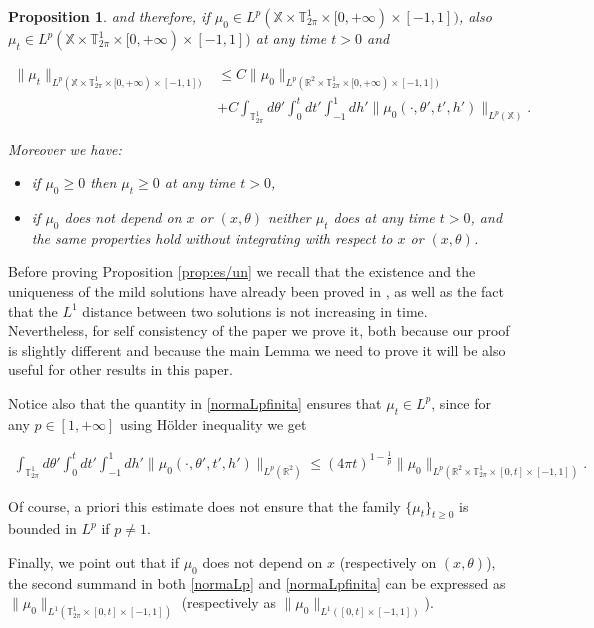 \documentclass[a4paper,10pt,reqno]{amsart}
\newtheorem{proposition}{Proposition}[section]
\numberwithin{equation}{subsection}
\numberwithin{figure}{subsection}
\begin{document}
\begin{proposition}
and therefore, if $\mu_0\in L^p(\mathbb{X}\times\mathbb{T}^1_{2\pi}\times[0,+\infty)\times[-1,1])$, also $\mu_t\in L^p(\mathbb{X}\times\mathbb{T}^1_{2\pi}\times[0,+\infty)\times[-1,1])$ at any time $t>0$ and

\begin{align}
\nonumber\|\mu_t\|_{L^p(\mathbb{X}\times\mathbb{T}^1_{2\pi}\times[0,+\infty)\times[-1,1])}&\leq C\|\mu_0\|_{L^p(\mathbb{R}^2\times\mathbb{T}^1_{2\pi}\times[0,+\infty)\times[-1,1])}
\\
\label{normaLpfinita}&+C\int_{\mathbb{T}^1_{2\pi}}d\theta'\int_0^tdt'\int_{-1}^1dh'\|\mu_0(\cdot,\theta',t',h')\|_{L^p(\mathbb{X})}.
\end{align}

Moreover we have:
\begin{itemize}
\item if $\mu_0\geq0$ then $\mu_t\geq0$ at any time $t>0$,
\item if $\mu_0$ does not depend on $x$ or $(x,\theta)$ neither $\mu_t$ does at any time $t>0$, and the same properties hold without integrating with respect to $x$ or $(x,\theta)$.
\end{itemize}
\end{proposition}
Before proving Proposition \ref{prop:es/un} we recall that the existence and the uniqueness of the mild solutions have already been proved in \cite{CG2010,MS2008bgl}, as well as the fact that the $L^1$ distance between two solutions is not increasing in time. Nevertheless, for self consistency of the paper we prove it, both because our proof is slightly different and because the main Lemma we need to prove it will be also useful for other results in this paper.

Notice also that the quantity in \eqref{normaLpfinita} ensures that $\mu_t\in L^p$, since for any $p\in[1,+\infty]$ using H\"older inequality we get

\begin{align*}
\int_{\mathbb{T}^1_{2\pi}}d\theta'\int_0^tdt'\int_{-1}^1dh'\|\mu_0(\cdot,\theta',t',h')\|_{L^p(\mathbb{R}^2)}\leq(4\pi t)^{1-\frac{1}{p}}\|\mu_0\|_{L^p(\mathbb{R}^2\times\mathbb{T}^1_{2\pi}\times[0,t]\times[-1,1])}.
\end{align*}

Of course, a priori this estimate does not ensure that the family $\{\mu_t\}_{t\geq0}$ is bounded in $L^p$ if $p\neq1$.

Finally, we point out that if $\mu_0$ does not depend on $x$ (respectively on $(x,\theta)$), the second summand in both \eqref{normaLp} and \eqref{normaLpfinita} can be expressed as $\|\mu_0\|_{L^1(\mathbb{T}^1_{2\pi}\times[0,t]\times[-1,1])}$ (respectively as $\|\mu_0\|_{L^1([0,t]\times[-1,1])}$).
\newline
\end{document}
